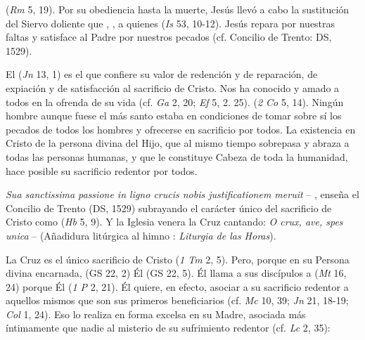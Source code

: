 \begin{ccebody}
  (\textit{Rm} 5, 19). Por su obediencia hasta la muerte, Jesús llevó a cabo la sustitución del Siervo doliente que , , a quienes  (\textit{Is} 53, 10-12). Jesús repara por nuestras faltas y satisface al Padre por nuestros pecados (cf. Concilio de Trento: DS, 1529).


 El  (\textit{Jn} 13, 1) es el que confiere su valor de redención y de reparación, de expiación y de satisfacción al sacrificio de Cristo. Nos ha conocido y amado a todos en la ofrenda de su vida (cf. \textit{Ga} 2, 20; \textit{Ef} 5, 2. 25).  (\textit{2 Co} 5, 14). Ningún hombre aunque fuese el más santo estaba en condiciones de tomar sobre sí los pecados de todos los hombres y ofrecerse en sacrificio por todos. La existencia en Cristo de la persona divina del Hijo, que al mismo tiempo sobrepasa y abraza a todas las personas humanas, y que le constituye Cabeza de toda la humanidad, hace posible su sacrificio redentor por todos.

 \textit{Sua sanctissima passione in ligno crucis nobis justificationem meruit} – , enseña el Concilio de Trento (DS, 1529) subrayando el carácter único del sacrificio de Cristo como  (\textit{Hb} 5, 9). Y la Iglesia venera la Cruz cantando: \textit{O crux, ave, spes unica} –  (Añadidura litúrgica al himno : \textit{Liturgia de las Horas}).


 La Cruz es el único sacrificio de Cristo  (\textit{1 Tm} 2, 5). Pero, porque en su Persona divina encarnada,  (GS 22, 2) Él  (GS 22, 5). Él llama a sus discípulos a  (\textit{Mt} 16, 24) porque Él  (\textit{1 P} 2, 21). Él quiere, en efecto, asociar a su sacrificio redentor a aquellos mismos que son sus primeros beneficiarios (cf. \textit{Mc} 10, 39; \textit{Jn} 21, 18-19; \textit{Col} 1, 24). Eso lo realiza en forma excelsa en su Madre, asociada más íntimamente que nadie al misterio de su sufrimiento redentor (cf. \textit{Lc} 2, 35):


\end{ccebody}
